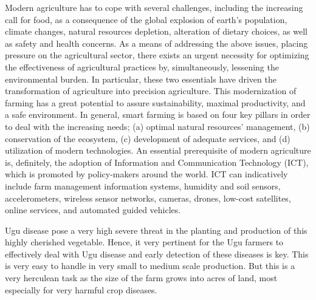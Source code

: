 Modern agriculture has to cope with several challenges, including the increasing call for food, as a consequence of the global explosion of earth’s population, climate changes, natural resources depletion, alteration of dietary choices, as well as safety and health concerns. As a means of addressing the above issues, placing pressure on the agricultural sector, there exists an urgent necessity for optimizing the effectiveness of agricultural practices by, simultaneously, lessening the environmental burden. In particular, these two essentials have driven the transformation of agriculture into precision agriculture. This modernization of farming has a great potential to assure sustainability, maximal productivity, and a safe environment. In general, smart farming is based on four key pillars in order to deal with the increasing needs; (a) optimal natural resources’ management, (b) conservation of the ecosystem, (c) development of adequate services, and (d) utilization of modern technologies. An essential prerequisite of modern agriculture is, definitely, the adoption of Information and Communication Technology (ICT), which is promoted by policy-makers around the world. ICT can indicatively include farm management information systems, humidity and soil sensors, accelerometers, wireless sensor networks, cameras, drones, low-cost satellites, online services, and automated guided vehicles.\newline \citep{benosMachineLearningAgriculture2021}

Ugu disease pose a very high severe threat in the planting and production of this highly cherished vegetable. Hence, it very pertinent for the Ugu farmers to effectively deal with Ugu disease and early detection of these diseases is key. This is very easy to handle in very small to medium scale production. But this is a very herculean task as the size of the farm grows into acres of land, most especially for very harmful crop diseases.


